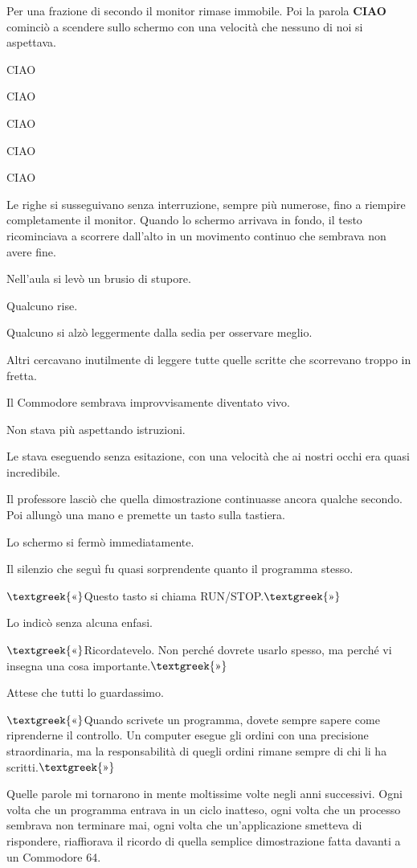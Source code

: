 \documentclass{article}
\begin{document}
Per una frazione di secondo il monitor rimase immobile. Poi la parola \textbf{CIAO} cominciò a scendere sullo schermo
con una velocità che nessuno di noi si aspettava.

CIAO

CIAO

CIAO

CIAO

CIAO

Le righe si susseguivano senza interruzione, sempre più numerose, fino a riempire completamente il monitor. Quando lo
schermo arrivava in fondo, il testo ricominciava a scorrere dall'alto in un movimento continuo che sembrava non avere
fine.

Nell'aula si levò un brusio di stupore.

Qualcuno rise.

Qualcuno si alzò leggermente dalla sedia per osservare meglio.

Altri cercavano inutilmente di leggere tutte quelle scritte che scorrevano troppo in fretta.

Il Commodore sembrava improvvisamente diventato vivo.

Non stava più aspettando istruzioni.

Le stava eseguendo senza esitazione, con una velocità che ai nostri occhi era quasi incredibile.

Il professore lasciò che quella dimostrazione continuasse ancora qualche secondo. Poi allungò una mano e premette un
tasto sulla tastiera.

Lo schermo si fermò immediatamente.

Il silenzio che seguì fu quasi sorprendente quanto il programma stesso.

$\text{\textgreek{«}}$Questo tasto si chiama RUN/STOP.$\text{\textgreek{»}}$

Lo indicò senza alcuna enfasi.

$\text{\textgreek{«}}$Ricordatevelo. Non perché dovrete usarlo spesso, ma perché vi insegna una cosa
importante.$\text{\textgreek{»}}$

Attese che tutti lo guardassimo.

$\text{\textgreek{«}}$Quando scrivete un programma, dovete sempre sapere come riprenderne il controllo. Un computer
esegue gli ordini con una precisione straordinaria, ma la responsabilità di quegli ordini rimane sempre di chi li ha
scritti.$\text{\textgreek{»}}$

Quelle parole mi tornarono in mente moltissime volte negli anni successivi. Ogni volta che un programma entrava in un
ciclo inatteso, ogni volta che un processo sembrava non terminare mai, ogni volta che un'applicazione smetteva di
rispondere, riaffiorava il ricordo di quella semplice dimostrazione fatta davanti a un Commodore 64.
\end{document}

